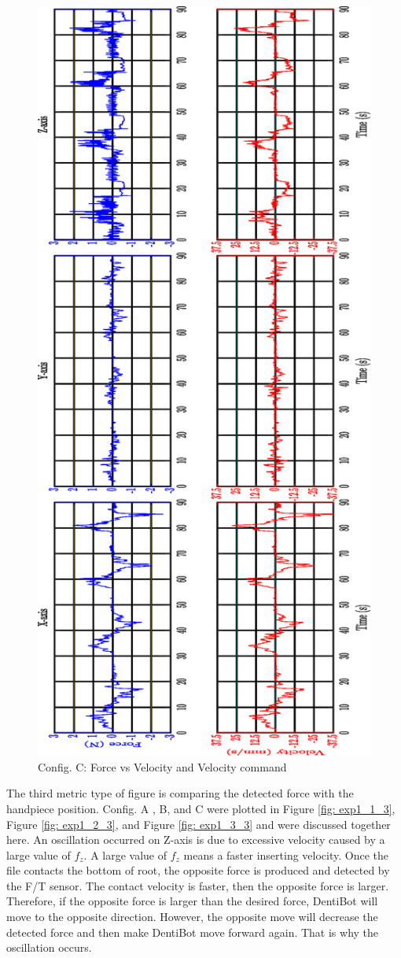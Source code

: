 \begin{figure}[htbp]
\begin{center}
\includegraphics[width=0.7\linewidth]{Images/exp/ConfigC_2.eps}
\caption{Config. C: Force vs Velocity and Velocity command}
\label{fig: exp1_3_2}
\end{center}
\end{figure}

\par
The third metric type of figure is comparing the detected force with the handpiece position. Config. A , B, and C were plotted in Figure \ref{fig: exp1_1_3}, Figure \ref{fig: exp1_2_3}, and Figure \ref{fig: exp1_3_3} and were discussed together here. An oscillation occurred on Z-axis is due to excessive velocity caused by a large value of $f_z$. A large value of $f_z$ means a faster inserting velocity. Once  the file contacts the bottom of root, the opposite force is produced and detected by the F/T sensor. The contact velocity is faster, then the opposite force is larger. Therefore, if the opposite force is larger than the desired force, DentiBot will move to the opposite direction. However, the opposite move will decrease the detected force and then make DentiBot move forward again. That is why the oscillation occurs.

